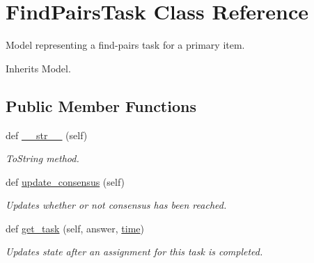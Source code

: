 \hypertarget{classjoinapp_1_1models_1_1task__management__models_1_1_find_pairs_task}{}\section{Find\+Pairs\+Task Class Reference}
\label{classjoinapp_1_1models_1_1task__management__models_1_1_find_pairs_task}


Model representing a find-\/pairs task for a primary item.  




Inherits Model.

\subsection*{Public Member Functions}
\begin{DoxyCompactItemize}
\item 
def \mbox{\hyperlink{classjoinapp_1_1models_1_1task__management__models_1_1_find_pairs_task_a23e8041ce1015febe4fdace3225714f9}{\+\_\+\+\_\+str\+\_\+\+\_\+}} (self)
\begin{DoxyCompactList}\small\item\em To\+String method. \end{DoxyCompactList}\item 
def \mbox{\hyperlink{classjoinapp_1_1models_1_1task__management__models_1_1_find_pairs_task_a0725a782a5d789d4b49b1f38bbfcb5f0}{update\+\_\+consensus}} (self)
\begin{DoxyCompactList}\small\item\em Updates whether or not consensus has been reached. \end{DoxyCompactList}\item 
def \mbox{\hyperlink{classjoinapp_1_1models_1_1task__management__models_1_1_find_pairs_task_a5c2eb6f87a32af834dd29469a6189f0c}{get\+\_\+task}} (self, answer, \mbox{\hyperlink{classjoinapp_1_1models_1_1task__management__models_1_1_find_pairs_task_a70c092a6aebace0b1ea406e14da78a40}{time}})
\begin{DoxyCompactList}\small\item\em Updates state after an assignment for this task is completed. \end{DoxyCompactList}\end{DoxyCompactItemize}
